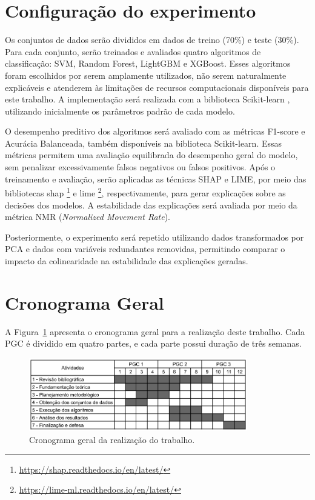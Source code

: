 \section{Configuração do experimento}\label{sec:cofiguracao_experimentos}
Os conjuntos de dados serão divididos em dados de treino (70\%) e teste (30\%). Para cada conjunto, serão treinados e avaliados quatro algoritmos de classificação: SVM, Random Forest, LightGBM e XGBoost. Esses algoritmos foram escolhidos por serem amplamente utilizados, não serem naturalmente explicáveis e atenderem às limitações de recursos computacionais disponíveis para este trabalho. A implementação será realizada com a biblioteca Scikit-learn \cite{scikit-learn}, utilizando inicialmente os parâmetros padrão de cada modelo.

O desempenho preditivo dos algoritmos será avaliado com as métricas F1-score e Acurácia Balanceada, também disponíveis na biblioteca Scikit-learn. Essas métricas permitem uma avaliação equilibrada do desempenho geral do modelo, sem penalizar excessivamente falsos negativos ou falsos positivos. Após o treinamento e avaliação, serão aplicadas as técnicas SHAP e LIME, por meio das bibliotecas shap \footnote{\url{https://shap.readthedocs.io/en/latest/}} e lime \footnote{\url{https://lime-ml.readthedocs.io/en/latest/}}, respectivamente, para gerar explicações sobre as decisões dos modelos. A estabilidade das explicações será avaliada por meio da métrica NMR (\textit{Normalized Movement Rate}).

Posteriormente, o experimento será repetido utilizando dados transformados por PCA e dados com variáveis redundantes removidas, permitindo comparar o impacto da colinearidade na estabilidade das explicações geradas.


\section{Cronograma Geral}\label{sec:cronograma}

A Figura~\ref{fig:cronograma_geral} apresenta o cronograma geral para a realização deste trabalho. Cada PGC é dividido em quatro partes, e cada parte possui duração de três semanas.

\begin{figure}[htbp]
	\centering
	\includegraphics[width=0.85\textwidth]{figs/Cronograma_Pgc1.png}
	\caption{Cronograma geral da realização do trabalho.}
	\label{fig:cronograma_geral}
\end{figure}


